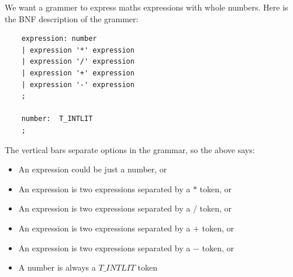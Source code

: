 \documentclass[a4paper,12pt]{article}
\begin{document}
We want a grammer to express maths expressions with whole numbers. Here is the BNF description of the grammer:

\begin{lstlisting}
    expression: number
    | expression '*' expression
    | expression '/' expression
    | expression '+' expression
    | expression '-' expression
    ;

    number:  T_INTLIT
    ;
\end{lstlisting}

The vertical bars separate options in the grammar, so the above says:

\begin{itemize}
    \item An expression could be just a number, or
    \item An expression is two expressions separated by a $*$ token, or
    \item An expression is two expressions separated by a $/$ token, or
    \item An expression is two expressions separated by a $+$ token, or
    \item An expression is two expressions separated by a $-$ token, or
    \item A number is always a $T\_INTLIT$ token
\end{itemize}
\end{document}
